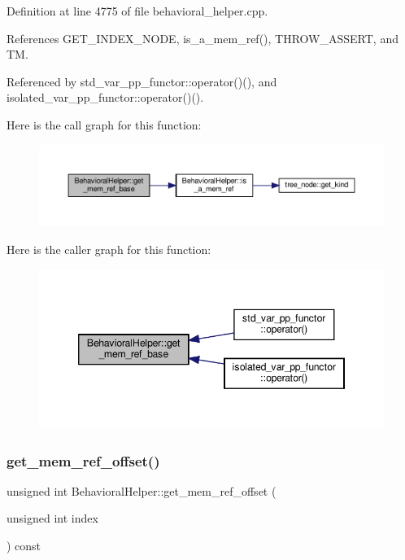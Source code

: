 Definition at line 4775 of file behavioral\+\_\+helper.\+cpp.



References G\+E\+T\+\_\+\+I\+N\+D\+E\+X\+\_\+\+N\+O\+DE, is\+\_\+a\+\_\+mem\+\_\+ref(), T\+H\+R\+O\+W\+\_\+\+A\+S\+S\+E\+RT, and TM.



Referenced by std\+\_\+var\+\_\+pp\+\_\+functor\+::operator()(), and isolated\+\_\+var\+\_\+pp\+\_\+functor\+::operator()().

Here is the call graph for this function\+:
\nopagebreak
\begin{figure}[H]
\begin{center}
\leavevmode
\includegraphics[width=350pt]{dd/db2/classBehavioralHelper_a2df88b4bc5b3891c8aa7b7a5109ca64f_cgraph}
\end{center}
\end{figure}
Here is the caller graph for this function\+:
\nopagebreak
\begin{figure}[H]
\begin{center}
\leavevmode
\includegraphics[width=346pt]{dd/db2/classBehavioralHelper_a2df88b4bc5b3891c8aa7b7a5109ca64f_icgraph}
\end{center}
\end{figure}
\mbox{\label{classBehavioralHelper_a58132ba58a157b34ad4e69a1ca1a5802}} 
\subsubsection{\texorpdfstring{get\+\_\+mem\+\_\+ref\+\_\+offset()}{get\_mem\_ref\_offset()}}
{\footnotesize\ttfamily unsigned int Behavioral\+Helper\+::get\+\_\+mem\+\_\+ref\+\_\+offset (\begin{DoxyParamCaption}\item[{unsigned int}]{index }\end{DoxyParamCaption}) const\hspace{0.3cm}{\ttfamily [virtual]}}



